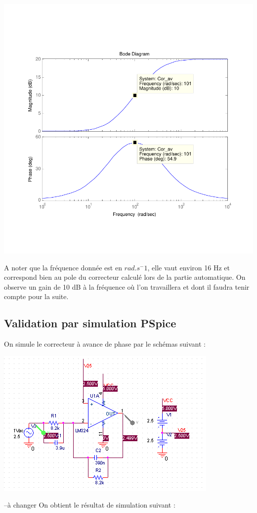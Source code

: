 \documentclass[11pt, french]{article} %
\begin{document}
\begin{center}
\includegraphics[scale = 0.8]{SolutionAnalogique/BodeAvPhase.pdf} 
\end{center}

A noter que la fréquence donnée est en $rad.s^-1$, elle vaut environ 16 Hz et correspond bien au pole du correcteur calculé lors de la partie automatique. On observe un gain de 10 dB à la fréquence où l'on travaillera et dont il faudra tenir compte pour la suite. 



\subsection{Validation par simulation PSpice}

On simule le correcteur à avance de phase par le schémas suivant : 

\begin{center}
\includegraphics[scale = 0.8]{SolutionAnalogique/schAvph.png} 
\end{center}
--à changer
On obtient le résultat de simulation suivant : 
\end{document}

